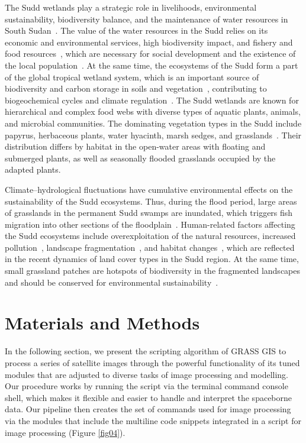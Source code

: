 \documentclass[analytics,article,accept,pdftex,moreauthors]{Definitions/mdpi}
\begin{document}
The Sudd wetlands play a strategic role in livelihoods, environmental sustainability, biodiversity balance, and the maintenance of water resources in South Sudan~\cite{Benansio}. The value of the water resources in the Sudd relies on its economic and environmental services, high biodiversity impact, and fishery and food resources~\cite{Bailey}, which are necessary for social development and the existence of the local population~\cite{assessment2005ecosystems}. At the same time, the ecosystems of the Sudd form a part of the global tropical wetland system, which is an important source of biodiversity and carbon storage in soils and vegetation~\cite{Thompson}, contributing to biogeochemical cycles and climate regulation~\cite{Fynn}. %
The Sudd wetlands are known for hierarchical and complex food webs with diverse types of aquatic plants, animals, and microbial communities. The dominating vegetation types in the Sudd include papyrus, herbaceous plants, water hyacinth, marsh sedges, and grasslands~\cite{PACINI2018142}. Their distribution differs by habitat in the open-water areas with floating and submerged plants, as well as seasonally flooded grasslands occupied by the adapted plants. 

Climate--hydrological fluctuations have cumulative environmental effects on the sustainability of the Sudd ecosystems. %
Thus, during the flood period, large areas of grasslands in the permanent Sudd swamps are inundated, which triggers fish migration into other sections of the floodplain~\cite{Hickley}. Human-related factors affecting the Sudd ecosystems include overexploitation of the natural resources, increased pollution~\cite{LOW2021113424}, landscape fragmentation~\cite{Collins}, and habitat changes~\cite{NAGENDRA201345}, which are reflected in the recent dynamics of land cover types in the Sudd region. At the same time, small grassland patches are  hotspots of biodiversity in the fragmented landscapes and should be conserved for environmental sustainability~\cite{YAN2021108086}. 

\section{Materials and Methods}

{In the following section, we present the scripting algorithm of GRASS GIS to process a series of  satellite images through the powerful functionality of its tuned modules that are adjusted to diverse tasks of image processing and modelling. Our procedure works by  running the script via the terminal command console shell, which makes it flexible and easier to handle and interpret the spaceborne data. %
Our pipeline then creates the set of commands used for image processing via the modules that include the multiline code snippets integrated in a script for image processing (Figure }\ref{fig04}).
\end{document}
